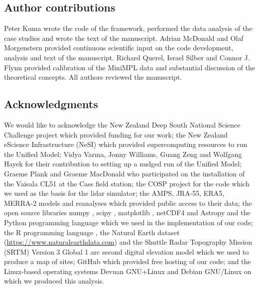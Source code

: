 \subsection*{Author contributions}

Peter Kuma wrote the code of the framework, performed the data analysis
of the case studies and wrote the text of the manuscript. Adrian McDonald and
Olaf Morgenstern provided continuous scientific input on the code development,
analysis and text of the manuscript. Richard Querel, Israel Silber and Connor
J. Flynn provided calibration of the MiniMPL data and substantial discussion
of the theoretical concepts. All authors reviewed the manuscript.

\subsection*{Acknowledgments}

We would like to acknowledge the New Zealand Deep South National Science Challenge 
project which provided funding for our work; the New Zealand eScience
Infrastructure (NeSI) which provided supercomputing resources to run the Unified
Model; Vidya Varma, Jonny Williams, Guang Zeng and Wolfgang Hayek for their
contribution to setting up a nudged run of the Unified Model;
Graeme Plank and Graeme MacDonald who participated on the installation of
the Vaisala CL51 at the Cass field station; the COSP project for the code which
we used as the basis for the lidar simulator; the AMPS, JRA-55, ERA5, MERRA-2
models and reanalyses which provided public access to their data; the open source libraries numpy \citep{derwalt2011}, scipy \citep{scipy2019}, matplotlib \citep{hunter2007}, netCDF4 \citep{rew1990} and Astropy \citep{astropy2018} and the
Python programming language \citep{rossum1995} which we used in the
implementation of our code; the R programming language \citep{r2017}, the Natural Earth
dataset (\url{https://www.naturalearthdata.com}) and the Shuttle Radar Topography Mission (SRTM) Version 3 Global 1 arc second digital elevation model \citep{werner2001,srtm}
which we used to produce a map of sites; GitHub which provided free hosting
of our code; and the Linux-based \citep{torvalds1997} operating systems
Devuan GNU+Linux and Debian GNU/Linux on which we produced this analysis.

\normalfont
\normalsize
